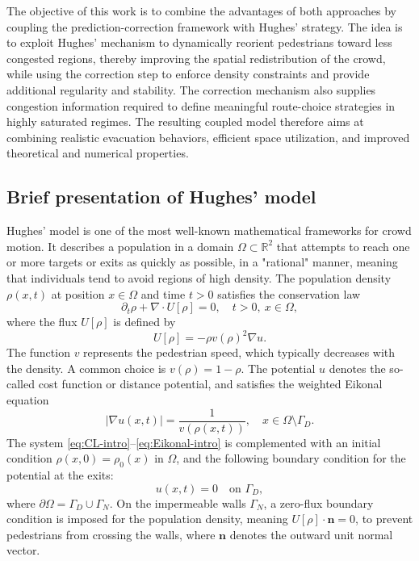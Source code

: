 \documentclass[final,reqno]{amsart}
\theoremstyle{plain}
\theoremstyle{definition}
\theoremstyle{remark}
\numberwithin{remark}{section}	%
\numberwithin{example}{section}	%
\begin{document}
The objective of this work is to combine the advantages of both approaches by coupling the prediction-correction framework with Hughes' strategy. The idea is to exploit Hughes' mechanism to dynamically reorient pedestrians toward less congested regions, thereby improving the spatial redistribution of the crowd, while using the correction step to enforce density constraints and provide additional regularity and stability. The correction mechanism also supplies congestion information required to define meaningful route-choice strategies in highly saturated regimes. The resulting coupled model therefore aims at combining realistic evacuation behaviors, efficient space utilization, and improved theoretical and numerical properties.

\subsection{Brief presentation of Hughes' model}
Hughes' model \cite{Hughes2002, Hughes2003} is one of the most well-known mathematical frameworks for crowd motion. It describes a population in a domain $\Omega \subset \mathbb{R}^2$ that attempts to reach one or more targets or exits as quickly as possible, in a "rational" manner, meaning that individuals tend to avoid regions of high density. The population density $\rho(x,t)$ at position $x \in \Omega$ and time $t > 0$ satisfies the conservation law
\begin{equation}\label{eq:CL-intro}
\partial_t \rho + \nabla \cdot U[\rho] = 0, \quad t > 0,~x \in \Omega,
\end{equation}
where the flux $U[\rho]$ is defined by \begin{equation}\label{HM0} U[\rho] = -\rho v(\rho)^2 \nabla u. \end{equation} 
The function $v$ represents the pedestrian speed, which typically decreases with the density. A common choice is $v(\rho) = 1 - \rho$. The potential $u$ denotes the so-called cost function or distance potential, and satisfies the weighted Eikonal equation
\begin{equation}\label{eq:Eikonal-intro}
\vert\nabla u(x,t)\vert = \frac{1}{v(\rho(x,t))}, \quad x \in \Omega \setminus \Gamma_D.
\end{equation}
 The system \eqref{eq:CL-intro}--\eqref{eq:Eikonal-intro} is complemented with an initial condition $\rho(x,0) = \rho_0(x)$ in $\Omega$, and the following boundary condition for the potential at the exits:
\begin{equation}\label{eq:BC-Hughes-intro}
    u(x,t) = 0 \quad \text{on } \Gamma_D, 
\end{equation}
where $\partial \Omega = \Gamma_D \cup \Gamma_N$. On the impermeable walls $\Gamma_N$, a zero-flux boundary condition is imposed for the population density, meaning $U[\rho] \cdot \mathbf{n} = 0$, to prevent pedestrians from crossing the walls, where $\mathbf{n}$ denotes the outward unit normal vector. 
\end{document}
